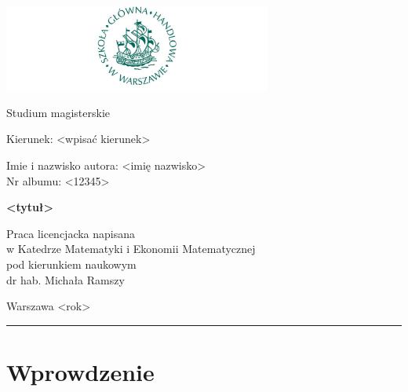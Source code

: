 \documentclass[polish, twoside, 12pt, a4paper]{article}
\theoremstyle{definition}
\theoremstyle{plain}
\theoremstyle{remark}
\begin{document}
\begin{titlepage}
\centering

\includegraphics[width=0.66\textwidth]{logo.JPG}

\vspace*{0.5cm}
Studium magisterskie\\
\begin{flushleft}
Kierunek: <wpisać kierunek>\\
\end{flushleft}

\vspace*{.5cm}
\rule{0cm}{1cm}\hfill
\begin{minipage}{9cm}
Imie i nazwisko autora: <imię nazwisko>\\
Nr albumu: <12345>
\end{minipage}

\vspace*{1cm}
\begin{minipage}{12cm}
\centering
\Large
\textbf{<tytuł>}
\end{minipage}

\vspace*{2cm}
\rule{0cm}{1cm}\hfill
\begin{minipage}{9cm}
Praca licencjacka napisana\\
w Katedrze Matematyki i Ekonomii Matematycznej\\
pod kierunkiem naukowym\\
dr hab. Michała Ramszy
\end{minipage}

\vfill
Warszawa <rok>
\end{titlepage}

\rule{1ex}{0ex}\clearpage


\cleardoublepage
\tableofcontents

\cleardoublepage
\section{Wprowdzenie}
\end{document}
